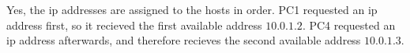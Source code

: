 Yes, the ip addresses are assigned to the hosts in order. PC1 requested an ip address first, so it recieved the first available address $10.0.1.2$. PC4 requested an ip address afterwards, and therefore recieves the second available address $10.0.1.3$.
